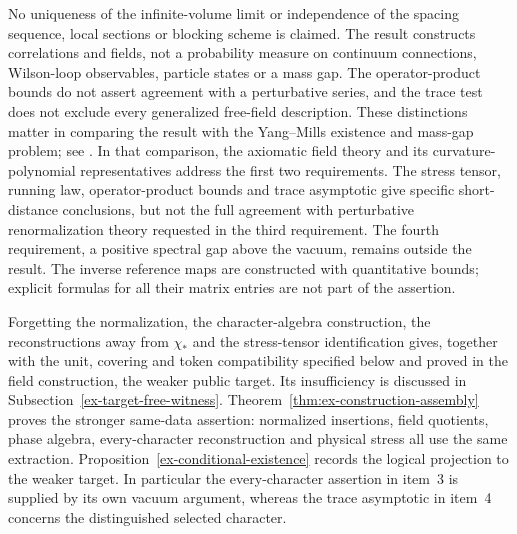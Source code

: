 No uniqueness of the infinite-volume limit or independence of the spacing
sequence, local sections or blocking scheme is claimed. The result constructs
correlations and fields, not a probability measure on continuum connections,
Wilson-loop observables, particle states or a mass gap. The operator-product
bounds do not assert agreement with a perturbative series, and the trace test
does not exclude every generalized free-field description. These distinctions
matter in comparing the result with the Yang--Mills existence and mass-gap
problem; see \cite[Sections~1--2, 7--9]{YMG26}. In that comparison, the
axiomatic field theory and its curvature-polynomial representatives address
the first two requirements. The stress tensor, running law, operator-product
bounds and trace asymptotic give specific short-distance conclusions, but
not the full agreement with perturbative renormalization theory requested
in the third requirement. The fourth requirement, a positive spectral gap
above the vacuum, remains outside the result. The inverse reference maps
are constructed with quantitative bounds; explicit formulas for all their
matrix entries are not part of the assertion.

Forgetting the normalization, the character-algebra construction, the
reconstructions away from $\chi_*$ and the stress-tensor identification
gives, together with the unit, covering and token compatibility specified
below and proved in the field construction, the weaker public target.
Its insufficiency is discussed in
Subsection~\ref{ex-target-free-witness}. Theorem~\ref{thm:ex-construction-assembly} proves the stronger
same-data assertion: normalized insertions, field quotients, phase algebra,
every-character reconstruction and physical stress all use the same
extraction. Proposition~\ref{ex-conditional-existence} records the logical
projection to the weaker target. In particular the every-character
assertion in item~3 is supplied by its own vacuum argument, whereas the
trace asymptotic in item~4 concerns the distinguished selected character.
